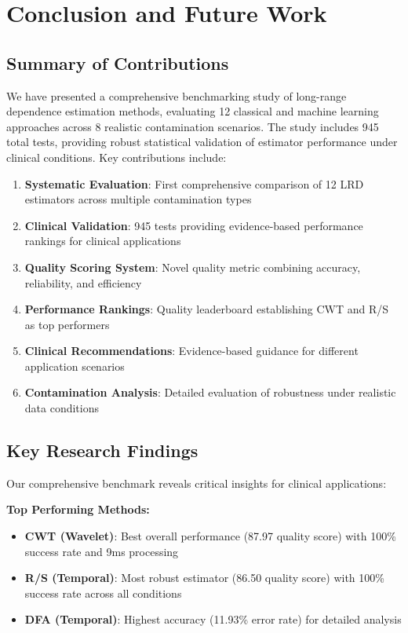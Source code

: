 \section{Conclusion and Future Work}

\subsection{Summary of Contributions}

We have presented a comprehensive benchmarking study of long-range dependence estimation methods, evaluating 12 classical and machine learning approaches across 8 realistic contamination scenarios. The study includes 945 total tests, providing robust statistical validation of estimator performance under clinical conditions. Key contributions include:

\begin{enumerate}
    \item \textbf{Systematic Evaluation}: First comprehensive comparison of 12 LRD estimators across multiple contamination types
    \item \textbf{Clinical Validation}: 945 tests providing evidence-based performance rankings for clinical applications
    \item \textbf{Quality Scoring System}: Novel quality metric combining accuracy, reliability, and efficiency
    \item \textbf{Performance Rankings}: Quality leaderboard establishing CWT and R/S as top performers
    \item \textbf{Clinical Recommendations}: Evidence-based guidance for different application scenarios
    \item \textbf{Contamination Analysis}: Detailed evaluation of robustness under realistic data conditions
\end{enumerate}

\subsection{Key Research Findings}

Our comprehensive benchmark reveals critical insights for clinical applications:

\textbf{Top Performing Methods:}
\begin{itemize}
    \item \textbf{CWT (Wavelet)}: Best overall performance (87.97 quality score) with 100\% success rate and 9ms processing
    \item \textbf{R/S (Temporal)}: Most robust estimator (86.50 quality score) with 100\% success rate across all conditions
    \item \textbf{DFA (Temporal)}: Highest accuracy (11.93\% error rate) for detailed analysis
\end{itemize}

